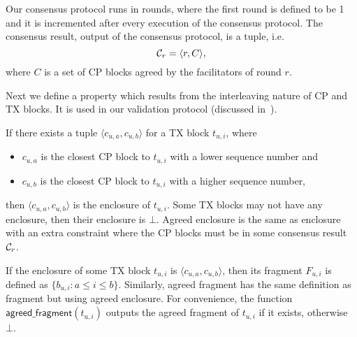 \begin{definition}
\label{sec:consensus-result}
Our consensus protocol runs in rounds,
where the first round is defined to be 1 and it is incremented after every execution of the consensus protocol.
The consensus result, output of the consensus protocol, is a tuple, i.e. 
$$\mathcal{C}_r = \langle r, C \rangle,$$
where $C$ is a set of CP blocks agreed by the facilitators of round $r$.
\end{definition}

Next we define a property which results from the interleaving nature of CP and TX blocks.
It is used in our validation protocol (discussed in~).

\begin{definition}
If there exists a tuple $\langle c_{u,a}, c_{u, b} \rangle$ for a TX block $t_{u, i}$, where
\begin{itemize}
\item $c_{u, a}$ is the closest CP block to $t_{u, i}$ with a lower sequence number and
\item $c_{u, b}$ is the closest CP block to $t_{u, i}$ with a higher sequence number,
\end{itemize}
then $\langle c_{u,a}, c_{u, b} \rangle$ is the enclosure of $t_{u, i}$.
Some TX blocks may not have any enclosure, then their enclosure is $\bot$.
Agreed enclosure is the same as enclosure with an extra constraint where the CP blocks must be in some consensus result $\mathcal{C}_r$.
\end{definition}

\begin{definition}
If the enclosure of some TX block $t_{u, i}$ is $\langle c_{u,a}, c_{u, b} \rangle$,
then its fragment $F_{u, i}$ is defined as $\{ b_{u, i} : a \le i \le b \}$.
Similarly, agreed fragment has the same definition as fragment but using agreed enclosure.
For convenience, the function $\textsf{agreed\_fragment}(t_{u, i})$ outputs the agreed fragment of $t_{u, i}$ if it exists, otherwise $\bot$.
\end{definition}

